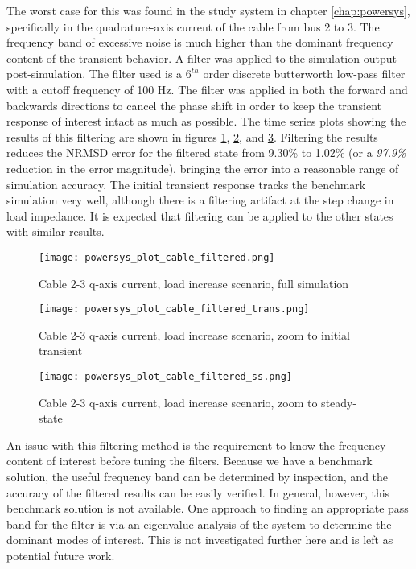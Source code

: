 The worst case for this was found in the study system in chapter \ref{chap:powersys}, specifically in the quadrature-axis current of the cable from bus 2 to 3. The frequency band of excessive noise is much higher than the dominant frequency content of the transient behavior. A filter was applied to the simulation output post-simulation. The filter used is a $6^{th}$ order discrete butterworth low-pass filter with a cutoff frequency of 100 Hz. The filter was applied in both the forward and backwards directions to cancel the phase shift in order to keep the transient response of interest intact as much as possible. The time series plots showing the results of this filtering are shown in figures \ref{fig:powersys_plot_cable_filtered}, \ref{fig:powersys_plot_cable_filtered_trans}, and \ref{fig:powersys_plot_cable_filtered_ss}. Filtering the results reduces the NRMSD error for the filtered state from 9.30\% to 1.02\% (or a \emph{97.9\%} reduction in the error magnitude), bringing the error into a reasonable range of simulation accuracy. The initial transient response tracks the benchmark simulation very well, although there is a filtering artifact at the step change in load impedance. It is expected that filtering can be applied to the other states with similar results. 

\begin{figure}[h]
    \centering
    \texttt{[image: powersys\_plot\_cable\_filtered.png]}
    \caption{Cable 2-3 q-axis current, load increase scenario, full simulation}
    \label{fig:powersys_plot_cable_filtered}
\end{figure} 

\begin{figure}[h]
    \centering
    \texttt{[image: powersys\_plot\_cable\_filtered\_trans.png]}
    \caption{Cable 2-3 q-axis current, load increase scenario, zoom to initial transient}
    \label{fig:powersys_plot_cable_filtered_trans}
\end{figure} 

\begin{figure}[h]
    \centering
    \texttt{[image: powersys\_plot\_cable\_filtered\_ss.png]}
    \caption{Cable 2-3 q-axis current, load increase scenario, zoom to steady-state}
    \label{fig:powersys_plot_cable_filtered_ss}
\end{figure} 

An issue with this filtering method is the requirement to know the frequency content of interest before tuning the filters. Because we have a benchmark solution, the useful frequency band can be determined by inspection, and the accuracy of the filtered results can be easily verified. In general, however, this benchmark solution is not available. One approach to finding an appropriate pass band for the filter is via an eigenvalue analysis of the system to determine the dominant modes of interest. This is not investigated further here and is left as potential future work.
